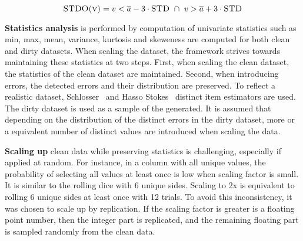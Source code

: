 \begin{equation}
\label{eq:is_outlier_std}
\textsc{STDO(v)} = v < \overline{a} - 3 \cdot \textsc{STD} \ \cap \ v > \overline{a} + 3 \cdot \textsc{STD} 
\end{equation}


\textbf{Statistics analysis} is performed by computation of univariate statistics such as min, max, mean, variance, kurtosis and skeweness are computed for both clean and dirty datasets.
When scaling the dataset, the framework strives towards maintaining these statistics at two steps.
First, when scaling the clean dataset, the statistics of the clean dataset are maintained. 
Second, when introducing errors, the detected errors and their distribution are preserved.
To reflect a realistic dataset, Schlosser~\cite{HassNSS1995} and Hasso Stokes~\cite{HassS1998} distinct item estimators are used. 
The dirty dataset is used as a sample of the generated. It is assumed that depending on the distribution of the distinct errors in the dirty dataset, more or a equivalent number of distinct values are introduced when scaling the data.


\textbf{Scaling up} clean data while preserving statistics is challenging, especially if applied at random. 
For instance, in a column with all unique values, the probability of selecting all values at least once is low when scaling factor is small. 
It is similar to the rolling dice with 6 unique sides. 
Scaling to 2x is equivalent to rolling 6 unique sides at least once with 12 trials.
To avoid this inconsistency, it was chosen to scale up by replication. 
If the scaling factor is greater is a floating point number, then the integer part is replicated, and the remaining floating part is sampled randomly from the clean data.


